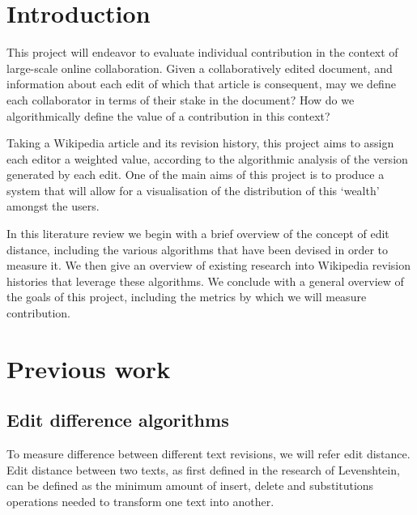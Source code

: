 \documentclass[a4paper,11pt,twoside,notitlepage]{article}
\begin{document}
        \tableofcontents

        \clearpage

        \section{Introduction}
        This project will endeavor to evaluate individual
        contribution in the context of large-scale online
        collaboration. Given a collaboratively edited document, and
        information about each edit of which that article is
        consequent, may we define each collaborator in terms of their
        stake in the document? How do we algorithmically define the
        value of a contribution in this context?

        Taking a Wikipedia article and its revision history, this
        project aims to assign each editor a weighted value, according
        to the algorithmic analysis of the version
        generated by each edit. One of the main aims of this project is to produce
        a system that will allow for a visualisation of the
        distribution of this `wealth' amongst the users.
        
        In this literature review we begin with a brief overview of
        the concept of edit distance, including the various algorithms
        that have been devised in order to measure it. We then give an
        overview of existing research into Wikipedia revision
        histories that leverage these algorithms. We conclude with a
        general overview of the goals of this project, including the
        metrics by which we will measure contribution.

        \section{Previous work}
        \subsection{Edit difference algorithms}
        To measure difference between different text revisions, we
        will refer edit distance. Edit distance between two texts,
        as first defined in the research of Levenshtein,\cite{Levenshtein1966} can be defined as the minimum
        amount of insert, delete and substitutions operations needed
        to transform one text into another.
\end{document}
